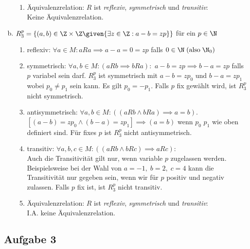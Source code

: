 \begin{enumerate}[a)]
\begin{enumerate}
      \item Äquivalenzrelation: $R$ ist \emph{reflexiv}, \emph{symmetrisch} und \emph{transitiv}: \\
      Keine Äquivalenzrelation.

    \end{enumerate}

  \vspace{1em}

  \item $ R_3^p = \{(a,b) \in \Z \times \Z \given{ \exists z \in \Z: a - b = z p } \} $ für ein $p \in \N$

    \begin{enumerate}
      \item reflexiv: $\forall a \in M: aRa \implies
      a - a = 0 = z p $ falls $ 0 \in \N \; ( \text{also} \; \N_0)$

      \item symmetrisch: $ \forall a, b \in M: (aRb \implies bRa):$
      $a - b = zp \implies b-a = zp$ falls $p$ variabel sein darf. $R_3^p$ ist symmetrisch mit $a-b =  zp_0$ und $b-a = zp_1$ wobei $p_0 \neq p_1$ sein kann. Es gilt $p_0 = -p_1$. Falls $p$ fix gewählt wird, ist $R_3^p$ nicht symmetrisch.

      \item antisymmetrisch: $ \forall a,b \in M : ((aRb \land bRa) \implies a = b). $\\
      $ [(a-b) = zp_0 \land (b-a) = zp_1] \implies (a=b)$ wenn $p_0$ $p_1$ wie oben definiert sind. Für fixes $p$ ist $R_3^p$ nicht antisymmetrisch.

      \item transitiv: $ \forall a,b,c \in M: ((aRb \land bRc) \implies aRc)  $:\\
      Auch die Transitivität gilt nur, wenn variable $p$ zugelassen werden. Beispielsweise bei der Wahl von $a = -1, \; b = 2, \; c = 4$ kann die Transitivität nur gegeben sein, wenn wir für $p$ positiv und negativ zulassen. Falls $p$ fix ist, ist $R_3^p$ nicht transitiv.

      \item Äquivalenzrelation: $R$ ist \emph{reflexiv}, \emph{symmetrisch} und \emph{transitiv}: \\
      I.A. keine Äquivalenzrelation.

    \end{enumerate}

  \end{enumerate}


  \subsection*{Aufgabe 3}

